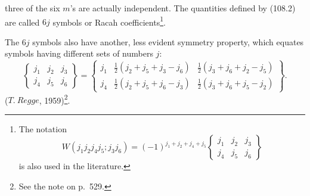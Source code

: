 three of the six $m$'s are actually independent. The quantities defined by (108.2) are called $6j$ symbols or Racah coefficients\footnote{The notation
\[
W(j_1j_2j_4j_5;j_3j_6)=(-1)^{j_1+j_2+j_4+j_5}
\left\{\begin{matrix}j_1&j_2&j_3\\j_4&j_5&j_6\end{matrix}\right\}
\]
is also used in the literature.}.



\begin{figure}[htbp]
\centering
{}
\caption{}
\label{fig:45}
\end{figure}

The $6j$ symbols also have another, less evident symmetry property, which equates symbols having different sets of numbers $j$:
\begin{equation}
\left\{\begin{matrix}j_1&j_2&j_3\\j_4&j_5&j_6\end{matrix}\right\}=
\left\{\begin{matrix}
j_1&\frac12(j_2+j_5+j_3-j_6)&\frac12(j_3+j_6+j_2-j_5)\\
j_4&\frac12(j_2+j_5+j_6-j_3)&\frac12(j_3+j_6+j_5-j_2)
\end{matrix}\right\}.
\tag{108.3}
\end{equation}
($T.\ Regge$, 1959)\footnote{See the note on p.~529.}.

